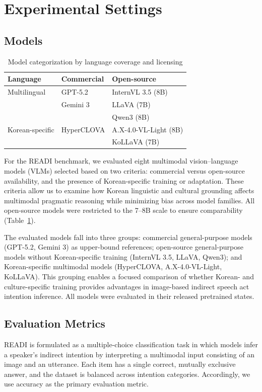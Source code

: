 \documentclass[11pt]{article}
\begin{document}
\section{Experimental Settings}
\subsection{Models}
\begin{table}[t]
\centering
\small
\setlength{\tabcolsep}{4pt}
\begin{tabular}{lll}
\toprule
\textbf{Language} & \textbf{Commercial} & \textbf{Open-source} \\
\midrule
Multilingual
& GPT-5.2        & InternVL 3.5 (8B) \\
& Gemini 3       & LLaVA (7B)       \\
&                & Qwen3 (8B)       \\
\midrule
Korean-specific
& HyperCLOVA     & A.X-4.0-VL-Light (8B)         \\
&                & KoLLaVA (7B)     \\
\bottomrule
\end{tabular}
\caption{Model categorization by language coverage and licensing}
\label{tab:model_categories}
\end{table}
For the READI benchmark, we evaluated eight multimodal vision–language models (VLMs) selected based on two criteria: commercial versus open-source availability, and the presence of Korean-specific training or adaptation. These criteria allow us to examine how Korean linguistic and cultural grounding affects multimodal pragmatic reasoning while minimizing bias across model families. All open-source models were restricted to the 7–8B scale to ensure comparability (Table~\ref{tab:model_categories}).

The evaluated models fall into three groups: commercial general-purpose models (GPT-5.2, Gemini 3) as upper-bound references; open-source general-purpose models without Korean-specific training (InternVL 3.5, LLaVA, Qwen3); and Korean-specific multimodal models (HyperCLOVA, A.X-4.0-VL-Light, KoLLaVA). This grouping enables a focused comparison of whether Korean- and culture-specific training provides advantages in image-based indirect speech act intention inference. All models were evaluated in their released pretrained states.
\subsection{Evaluation Metrics}
READI is formulated as a multiple-choice classification task in which models infer a speaker’s indirect intention by interpreting a multimodal input consisting of an image and an utterance. Each item has a single correct, mutually exclusive answer, and the dataset is balanced across intention categories. Accordingly, we use accuracy as the primary evaluation metric.
\end{document}

